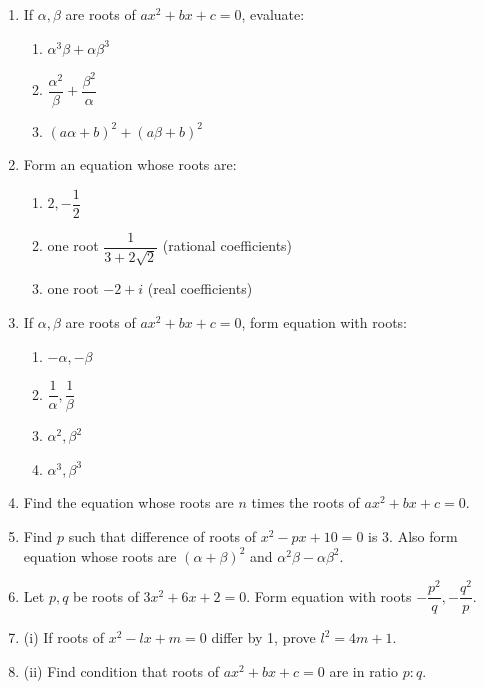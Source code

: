 \documentclass[12pt,a4paper]{article}
\begin{document}
\begin{enumerate}[label=Example \arabic*.]
    \item If \( \alpha, \beta \) are roots of \( ax^2 + bx + c = 0 \), evaluate:
    \begin{enumerate}[label=(\roman*)]
        \item \( \alpha^3\beta + \alpha\beta^3 \)
        \item \( \dfrac{\alpha^2}{\beta} + \dfrac{\beta^2}{\alpha} \)
        \item \( (a\alpha + b)^2 + (a\beta + b)^2 \)
    \end{enumerate}

    \item Form an equation whose roots are:
    \begin{enumerate}[label=(\roman*)]
        \item \( 2, -\dfrac{1}{2} \)
        \item one root \( \dfrac{1}{3+2\sqrt{2}} \) (rational coefficients)
        \item one root \( -2 + i \) (real coefficients)
    \end{enumerate}

    \item If \( \alpha, \beta \) are roots of \( ax^2 + bx + c = 0 \), form equation with roots:
    \begin{enumerate}[label=(\roman*)]
        \item \( -\alpha, -\beta \)
        \item \( \dfrac{1}{\alpha}, \dfrac{1}{\beta} \)
        \item \( \alpha^2, \beta^2 \)
        \item \( \alpha^3, \beta^3 \)
    \end{enumerate}

    \item Find the equation whose roots are \( n \) times the roots of \( ax^2 + bx + c = 0 \).

    \item Find \( p \) such that difference of roots of \( x^2 - px + 10 = 0 \) is 3. Also form equation whose roots are \( (\alpha + \beta)^2 \) and \( \alpha^2\beta - \alpha\beta^2 \).

    \item Let \( p, q \) be roots of \( 3x^2 + 6x + 2 = 0 \). Form equation with roots \( -\dfrac{p^2}{q}, -\dfrac{q^2}{p} \).

    \item (i) If roots of \( x^2 - lx + m = 0 \) differ by 1, prove \( l^2 = 4m + 1 \).
    \item (ii) Find condition that roots of \( ax^2 + bx + c = 0 \) are in ratio \( p:q \).


\end{enumerate}
\end{document}

